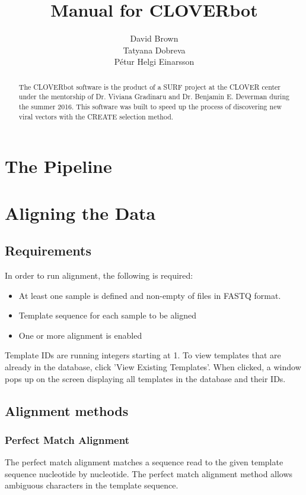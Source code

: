\documentclass[12pt,a4paper]{article}
\title{Manual for CLOVERbot}
\author{David Brown\\Tatyana Dobreva\\Pétur Helgi Einarsson}
\begin{document}
\sloppy
\maketitle

\begin{abstract}
The CLOVERbot software is the product of a SURF project at the CLOVER center 
under the mentorship of Dr. Viviana Gradinaru and Dr. Benjamin E. Deverman 
during the summer 2016. This software was built to speed up the process of
 discovering new viral vectors with the CREATE selection method.
\end{abstract}

\tableofcontents

\newpage

\section{The Pipeline}

\newpage
\section{Aligning the Data}

\subsection{Requirements}
In order to run alignment, the following is required:

\begin{itemize}
    \item At least one sample is defined and non-empty of files in FASTQ format.
    \item Template sequence for each sample to be aligned
    \item One or more alignment is enabled
\end{itemize}

Template IDs are running integers starting at 1. To view templates that are 
already in the database, click 'View Existing Templates'. When clicked, a 
window pops up on the screen displaying all templates in the database and their 
IDs. 

\subsection{Alignment methods}

\subsubsection{Perfect Match Alignment}
The perfect match alignment matches a sequence read to the given template 
sequence nucleotide by nucleotide. The perfect match alignment method allows 
ambiguous characters in the template sequence.
\end{document}
